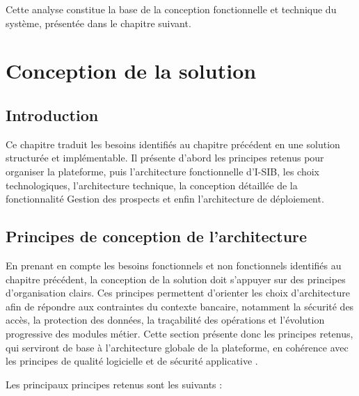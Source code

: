\documentclass[a4paper,12pt]{report}
\begin{document}
Cette analyse constitue la base de la conception fonctionnelle et technique du système,
présentée dans le chapitre suivant.

\chapter{Conception de la solution}

\section*{Introduction}
{}

Ce chapitre traduit les besoins identifiés au chapitre précédent en une solution
structurée et implémentable. Il présente d'abord les principes retenus pour organiser
la plateforme, puis l'architecture fonctionnelle d'I-SIB, les choix technologiques,
l'architecture technique, la conception détaillée de la fonctionnalité Gestion des
prospects et enfin l'architecture de déploiement.

\section{Principes de conception de l'architecture}

En prenant en compte les besoins fonctionnels et non fonctionnels identifiés au chapitre
précédent, la conception de la solution doit s'appuyer sur des principes d'organisation
clairs. Ces principes permettent d'orienter les choix d'architecture afin de répondre aux
contraintes du contexte bancaire, notamment la sécurité des accès, la protection des
données, la traçabilité des opérations et l'évolution progressive des modules métier.
Cette section présente donc les principes retenus, qui serviront de base à l'architecture
globale de la plateforme, en cohérence avec les principes de qualité logicielle
\cite{iso25010} et de sécurité applicative \cite{owasp_asvs}.

Les principaux principes retenus sont les suivants :
\end{document}
